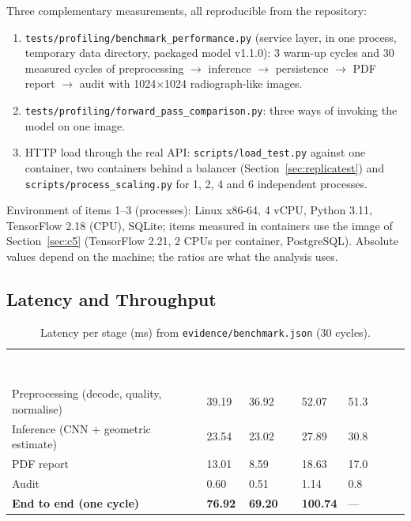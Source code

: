 \documentclass[12pt,a4paper]{article}
\newcommand{\fp}[1]{\nolinkurl{#1}}
\newcommand{\hd}[1]{\textcolor{white}{\textbf{#1}}}
\begin{document}
Three complementary measurements, all reproducible from the repository:
\begin{enumerate}[leftmargin=*]
    \item \fp{tests/profiling/benchmark_performance.py} (service layer, in one process, temporary data directory, packaged model v1.1.0): 3 warm-up cycles and 30 measured
          cycles of preprocessing $\to$ inference $\to$ persistence $\to$ PDF report $\to$ audit with 1024$\times$1024 radiograph-like images.
    \item \fp{tests/profiling/forward_pass_comparison.py}: three ways of invoking the model on one image.
    \item HTTP load through the real API: \fp{scripts/load_test.py} against one container, two containers behind a balancer (Section~\ref{sec:replicatest}) and
          \fp{scripts/process_scaling.py} for 1, 2, 4 and 6 independent processes.
\end{enumerate}
Environment of items 1--3 (processes): Linux x86-64, 4 vCPU, Python 3.11, TensorFlow 2.18 (CPU), SQLite; items measured in containers use the image of
Section~\ref{sec:c5} (TensorFlow 2.21, 2 CPUs per container, PostgreSQL). Absolute values depend on the machine; the ratios are what the analysis uses.

\subsection{Latency and Throughput}

\begin{table}[H]
\centering
\caption{Latency per stage (ms) from \fp{evidence/benchmark.json} (30 cycles).}
\label{tab:latency}
\renewcommand{\arraystretch}{1.25}
\begin{tabularx}{\textwidth}{Y C{1.6cm} C{1.6cm} C{1.6cm} C{1.6cm}}
\hd{Stage} & \hd{Mean} & \hd{Median} & \hd{P95} & \hd{\% of total} \\
Preprocessing (decode, quality, normalise) & 39.19 & 36.92 & 52.07 & 51.3 \\
Inference (CNN + geometric estimate) & 23.54 & 23.02 & 27.89 & 30.8 \\
PDF report & 13.01 & 8.59 & 18.63 & 17.0 \\
Audit & 0.60 & 0.51 & 1.14 & 0.8 \\
\textbf{End to end (one cycle)} & \textbf{76.92} & \textbf{69.20} & \textbf{100.74} & --- \\
\end{tabularx}
\end{table}
\end{document}
